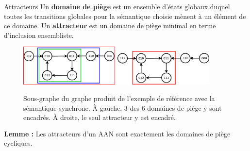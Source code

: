 \documentclass{beamer}
\begin{document}
\begin{frame}{Attracteurs}
	\pause
	Un \textbf{domaine de piège} est un ensemble d'états globaux duquel toutes les transitions globales pour la sémantique choisie mènent à un élément de ce domaine.
	\pause
	Un \textbf{attracteur} est un domaine de piège minimal en terme d'inclusion ensembliste.\\
	\begin{figure}[!h]
		\pause
		\includegraphics[width=5cm]{presonal_example_synch.eps}
		\includegraphics[width=5cm]{presonal_example_synch2.eps}
		\caption{Sous-graphe du graphe produit de l'exemple de référence avec la sémantique synchrone. \`A gauche, 3 des 6 domaines de piège y sont encadrés. \`A droite, le seul attracteur y est encadré.}
	\end{figure}
	\pause
	\textbf{Lemme :} Les attracteurs d'un AAN sont exactement les domaines de piège cycliques.
\end{frame}
\end{document}

